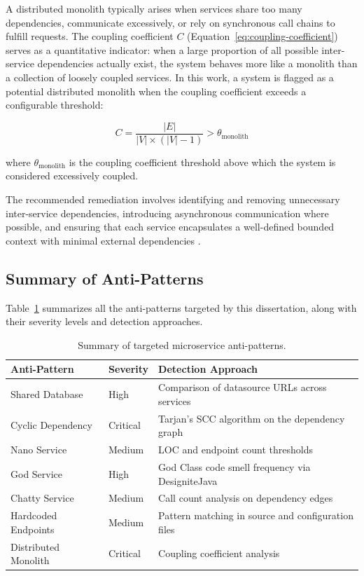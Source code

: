 A distributed monolith typically arises when services share too many dependencies, communicate excessively, or rely on synchronous call chains to fulfill requests. The coupling coefficient $C$ (Equation~\ref{eq:coupling-coefficient}) serves as a quantitative indicator: when a large proportion of all possible inter-service dependencies actually exist, the system behaves more like a monolith than a collection of loosely coupled services. In this work, a system is flagged as a potential distributed monolith when the coupling coefficient exceeds a configurable threshold:

\begin{equation}
    C = \frac{|E|}{|V| \times (|V| - 1)} > \theta_{\text{monolith}}
    \label{eq:distributed-monolith}
\end{equation}

\noindent where $\theta_{\text{monolith}}$ is the coupling coefficient threshold above which the system is considered excessively coupled.

The recommended remediation involves identifying and removing unnecessary inter-service dependencies, introducing asynchronous communication where possible, and ensuring that each service encapsulates a well-defined bounded context with minimal external dependencies \cite{Richardson2018}.

\subsection{Summary of Anti-Patterns}
\label{subsec:anti-patterns-summary}

\indent\par Table~\ref{tab:anti-patterns-summary} summarizes all the anti-patterns targeted by this dissertation, along with their severity levels and detection approaches.

\begin{table}[!ht]
\begin{center}
\begin{tabular}{|l|l|p{180pt}|}
\hline
\textbf{Anti-Pattern} & \textbf{Severity} & \textbf{Detection Approach} \\
\hline\hline
Shared Database & High & Comparison of datasource URLs across services \\
\hline
Cyclic Dependency & Critical & Tarjan's SCC algorithm on the dependency graph \\
\hline
Nano Service & Medium & LOC and endpoint count thresholds \\
\hline
God Service & High & God Class code smell frequency via DesigniteJava \\
\hline
Chatty Service & Medium & Call count analysis on dependency edges \\
\hline
Hardcoded Endpoints & Medium & Pattern matching in source and configuration files \\
\hline
Distributed Monolith & Critical & Coupling coefficient analysis \\
\hline
\end{tabular}
\end{center}
\caption{Summary of targeted microservice anti-patterns.}
\label{tab:anti-patterns-summary}
\end{table}

